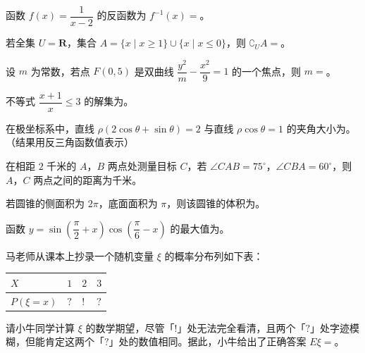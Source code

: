 

\begin{question}
函数 $f(x)=\dfrac1{x-2}$ 的反函数为 $f^{-1}(x)=$\gkblank{}。

\end{question}
\begin{question}
若全集 $U=\mathbf R$，集合 $A=\{x\mid x\geqslant1\}\cup\{x\mid x\leqslant0\}$，则 $\complement_U A=$\gkblank{}。

\end{question}
\begin{question}
设 $m$ 为常数，若点 $F(0,5)$ 是双曲线 $\dfrac{y^2}{m}-\dfrac{x^2}{9}=1$ 的一个焦点，则 $m=$\gkblank{}。

\end{question}
\begin{question}
不等式 $\dfrac{x+1}{x}\leqslant3$ 的解集为\gkblank{}。

\end{question}
\begin{question}
在极坐标系中，直线 $\rho(2\cos\theta+\sin\theta)=2$ 与直线 $\rho\cos\theta=1$ 的夹角大小为\gkblank{}。（结果用反三角函数值表示）

\end{question}
\begin{question}
在相距 $2$ 千米的 $A$，$B$ 两点处测量目标 $C$，若 $\angle CAB=75^\circ$，$\angle CBA=60^\circ$，则 $A$，$C$ 两点之间的距离为\gkblank{}千米。

\end{question}
\begin{question}
若圆锥的侧面积为 $2\pi$，底面面积为 $\pi$，则该圆锥的体积为\gkblank{}。

\end{question}
\begin{question}
函数 $y=\sin\left(\dfrac\pi2+x\right)\cos\left(\dfrac\pi6-x\right)$ 的最大值为\gkblank{}。

\end{question}
\begin{question}
马老师从课本上抄录一个随机变量 $\xi$ 的概率分布列如下表：

\begin{center}
\begin{tabular}{llll}
\toprule
$X$ & $1$ & $2$ & $3$ \\
\midrule
$P(\xi=x)$ & $?$ & $!$ & $?$ \\
\bottomrule
\end{tabular}
\end{center}

请小牛同学计算 $\xi$ 的数学期望，尽管「$!$」处无法完全看清，且两个「$?$」处字迹模糊，但能肯定这两个「$?$」处的数值相同。据此，小牛给出了正确答案 $E\xi=$\gkblank{}。

\end{question}
